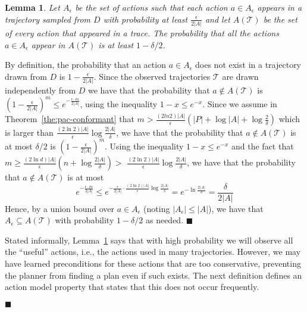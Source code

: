 \documentclass[letterpaper]{article}
\newtheorem{lemma}{Lemma}
\newenvironment{proof}{\noindent{\bf Proof:~~}}{\qed}
\newcommand{\qed}{\hfill\ensuremath{\blacksquare}}
\begin{document}
\begin{proof}
\begin{lemma}
Let $A_\epsilon$ be the set of actions such that each action $a\in A_\epsilon$ appears in a trajectory sampled from $D$ with probability at least $\frac{\epsilon}{2|A|}$ and let $A(\mathcal{T})$ be the set of every action that appeared in a trace. 
The probability that all the actions $a\in A_\epsilon$ 
appear in $A(\mathcal{T})$ is at least $1-\delta/2$.
\label{lem:sufficientActions}
\end{lemma}
\begin{proof}
By definition, the probability that an action $a\in A_\epsilon$ does not exist in a trajectory drawn from $D$ is $1-\frac{\epsilon}{2|A|}$. 
Since the observed trajectories $\mathcal{T}$ are drawn independently from $D$ we have that the probability that $a\notin A(\mathcal{T})$ is
$(1-\frac{\epsilon}{2|A|})^m\leq e^{-\frac{\epsilon\cdot m}{2|A|}}$, 
using the inequality $1-x\leq e^{-x}$. 
Since we assume in Theorem~\ref{the:pac-conformant} that $m>\frac{(2ln 2)|A|}{\epsilon}(|P|+\log |A|+\log\frac{2}{\delta})$
which is larger than $\frac{(2\ln 2)|A|}{\epsilon}\log\frac{2|A|}{\delta}$, 
we have that the probability that $a\notin A(\mathcal{T})$ is at most $\delta/2$ is $(1-\frac{\epsilon}{2|A|})^m$. 
Using the inequality $1-x\leq e^{-x}$ and 
the fact that 
$m\geq\frac{(2\ln  d)|A|}{\epsilon}(n+\log\frac{2|A|}{\delta})$$>$
$\frac{(2\ln 2)|A|}{\epsilon}\log\frac{2|A|}{\delta}$, we have that the probability that $a\notin A(\mathcal{T})$ is at most
\begin{equation}
e^{-\frac{\epsilon\cdot m}{2|A|}}
\leq e^{-\frac{\epsilon}{2|A|} \cdot \frac{(2\ln 2)|A|}{\epsilon}\log\frac{2|A|}{\delta}}
=e^{-\ln\frac{2|A|}{\delta}}=\frac{\delta}{2|A|}
\end{equation}
Hence, by a union bound over $a\in A_\epsilon$ (noting $|A_\epsilon|\leq |A|$), we have that $A_\epsilon\subseteq A(\mathcal{T})$ with probability $1-\delta/2$ as needed.
\end{proof}

Stated informally, Lemma~\ref{lem:sufficientActions} says that with high probability we will observe
all the ``useful'' actions, i.e., the actions used in many trajectories. However, we may have learned 
preconditions for these actions that are too conservative, 
preventing the planner from finding a plan even if such exists. 
The next definition defines an action model property that states that this does not occur frequently. 


\end{proof}
\end{document}
